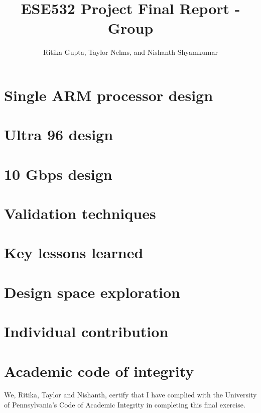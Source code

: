 \documentclass{article}
\title{ESE532 Project Final Report - Group}
\author{Ritika Gupta, Taylor Nelms, and Nishanth Shyamkumar}
\begin{document}
\maketitle


\section{Single ARM processor design}



\section{Ultra 96 design}

\section{10 Gbps design}

\section{Validation techniques}

\section{Key lessons learned}

\section{Design space exploration}

\section{Individual contribution}

\section{Academic code of integrity}
We, Ritika, Taylor and Nishanth, certify that I have complied with the University of Pennsylvania’s Code of Academic Integrity in completing this final exercise.
\end{document}
